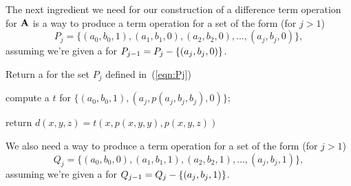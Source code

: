 The next ingredient we need for our construction of a
difference term operation for $\mathbf{A}$
is
a way to produce a \ld
term operation for a set of the form  (for $j>1$)
\begin{equation}
\label{eqn:Pj}
P_j = \{(a_0, b_0, 1), (a_1, b_1, 0), (a_2, b_2, 0), \dots,
(a_j, b_j, 0)\},
\end{equation}
assuming we're given a \ldto for $P_{j-1} = P_{j} - \{(a_j, b_j, 0)\}$.


\begin{comment}
\noindent \underline{\bf Subroutine \ild-0}\\[4pt]
The input, $p$,  is
a \ldto for $P_{j-1} = P_{j} \mysetminus \{(a_j, b_j, 0)\}$.
\begin{enumerate}[1.]
\item
Call Subroutine \ld-2 to
compute a \ldto $t$ for the set
\begin{equation*}
\{(a_0, b_0, 1), (a_j, p(a_j, b_j, b_j), 0)\}.
\end{equation*}
\item Return the following
\ldto for $P_j$:
\begin{equation}
d(x,y,z) = t(x, p(x,y,y), p(x,y,z)).
\label{eq:idl0-dto}
\end{equation}
\end{enumerate}
\qed
\end{comment}




\LinesNumbered
\begin{algorithm}%

\caption{Return a \ldto for the set $P_j$ defined in~(\ref{eqn:Pj})
\label{alg:ild0}}

compute a \ldto $t$ for $\{(a_0, b_0, 1), (a_j, p(a_j, b_j, b_j), 0)\}$;

return $d(x,y,z) = t(x, p(x,y,y), p(x,y,z))$

\end{algorithm}


We also need a way to produce a \ld
term operation for a set of the form  (for $j>1$)
\begin{equation}
\label{eqn:Qj}
Q_{j} = \{(a_0, b_0, 0), (a_1, b_1, 1), (a_2, b_2, 1), \dots,
(a_{j}, b_{j}, 1)\},
\end{equation}
assuming we're given a \ldto for
$Q_{j-1} = Q_j - \{(a_j, b_j, 1)\}$.

